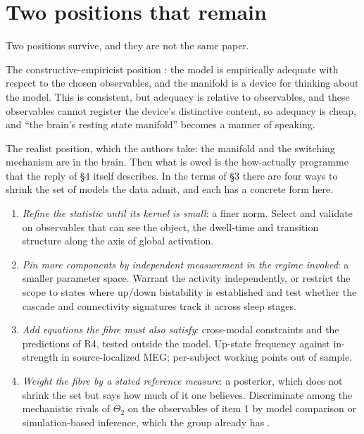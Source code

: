 \documentclass[11pt]{article}
\begin{document}
\section{Two positions that remain}
Two positions survive, and they are not the same paper.

The constructive-empiricist position \parencite{vanfraassen1980}: the model is empirically adequate with respect to the chosen observables, and the manifold is a device for thinking about the model. This is consistent, but adequacy is relative to observables, and these observables cannot register the device's distinctive content, so adequacy is cheap, and ``the brain's resting state manifold'' becomes a manner of speaking.

The realist position, which the authors take: the manifold and the switching mechanism are in the brain. Then what is owed is the how-actually programme that the reply of \S4 itself describes. In the terms of \S3 there are four ways to shrink the set of models the data admit, and each has a concrete form here.
\begin{enumerate}
\item \emph{Refine the statistic until its kernel is small}: a finer norm. Select and validate on observables that can see the object, the dwell-time and transition structure along the axis of global activation.
\item \emph{Pin more components by independent measurement in the regime invoked}: a smaller parameter space. Warrant the activity independently, or restrict the scope to states where up/down bistability is established and test whether the cascade and connectivity signatures track it across sleep stages.
\item \emph{Add equations the fibre must also satisfy}: cross-modal constraints and the predictions of R4, tested outside the model. Up-state frequency against in-strength in source-localized MEG; per-subject working points out of sample.
\item \emph{Weight the fibre by a stated reference measure}: a posterior, which does not shrink the set but says how much of it one believes. Discriminate among the mechanistic rivals of $\Theta_2$ on the observables of item 1 by model comparison or simulation-based inference, which the group already has \parencite{hashemi2024}.
\end{enumerate}
\end{document}
